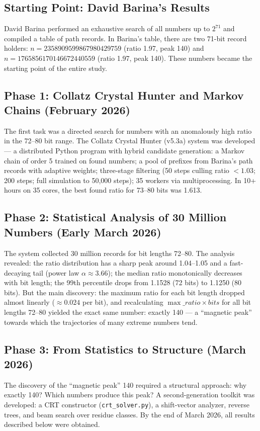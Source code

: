 \documentclass[12pt,a4paper]{article}
\theoremstyle{remark}
\begin{document}
\subsection{Starting Point: David Barina's Results}
David Barina performed an exhaustive search of all numbers up to $2^{71}$ and compiled a table of path records. In Barina's table, there are two 71-bit record holders: $n = 2358909599867980429759$ (ratio 1.97, peak 140) and $n = 1765856170146672440559$ (ratio 1.97, peak 140). These numbers became the starting point of the entire study.

\subsection{Phase 1: Collatz Crystal Hunter and Markov Chains (February 2026)}
The first task was a directed search for numbers with an anomalously high ratio in the 72--80 bit range. The Collatz Crystal Hunter (v5.3a) system was developed --- a distributed Python program with hybrid candidate generation: a Markov chain of order 5 trained on found numbers; a pool of prefixes from Barina's path records with adaptive weights; three-stage filtering (50 steps culling ratio $<1.03$; 200 steps; full simulation to 50,000 steps); 35 workers via multiprocessing. In 10+ hours on 35 cores, the best found ratio for 73--80 bits was 1.613.

\subsection{Phase 2: Statistical Analysis of 30 Million Numbers (Early March 2026)}
The system collected 30 million records for bit lengths 72--80. The analysis revealed: the ratio distribution has a sharp peak around 1.04--1.05 and a fast-decaying tail (power law $\alpha \approx 3.66$); the median ratio monotonically decreases with bit length; the 99th percentile drops from 1.1528 (72 bits) to 1.1250 (80 bits). But the main discovery: the maximum ratio for each bit length dropped almost linearly ($\approx 0.024$ per bit), and recalculating $\max\_ratio \times bits$ for all bit lengths 72--80 yielded the exact same number: exactly 140 --- a ``magnetic peak'' towards which the trajectories of many extreme numbers tend.

\subsection{Phase 3: From Statistics to Structure (March 2026)}
The discovery of the ``magnetic peak'' 140 required a structural approach: why exactly 140? Which numbers produce this peak? A second-generation toolkit was developed: a CRT constructor (\texttt{crt\_solver.py}), a shift-vector analyzer, reverse trees, and beam search over residue classes. By the end of March 2026, all results described below were obtained.
\end{document}
